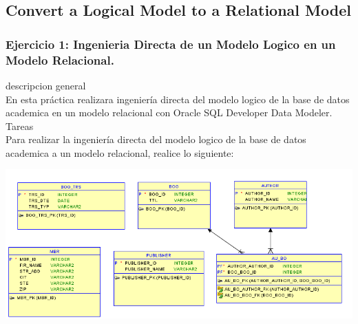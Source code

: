 \documentclass[12pt,letterpaper]{article}
\begin{document}
 \newpage
\subsection{Convert a Logical Model to a Relational Model}
 \newpage
\subsubsection{Ejercicio 1: Ingenieria Directa de un Modelo Logico en un Modelo Relacional.} 
descripcion general  \\
En esta práctica realizara ingeniería directa del modelo logico de la base de datos academica en un modelo relacional con Oracle SQL Developer Data Modeler. \\

Tareas\\
Para realizar la ingeniería directa del modelo logico de la base de datos academica a un modelo relacional, realice lo siguiente:

\includegraphics[width=15cm]{./soniaImagen/diagrama1.png} 
\end{document}
